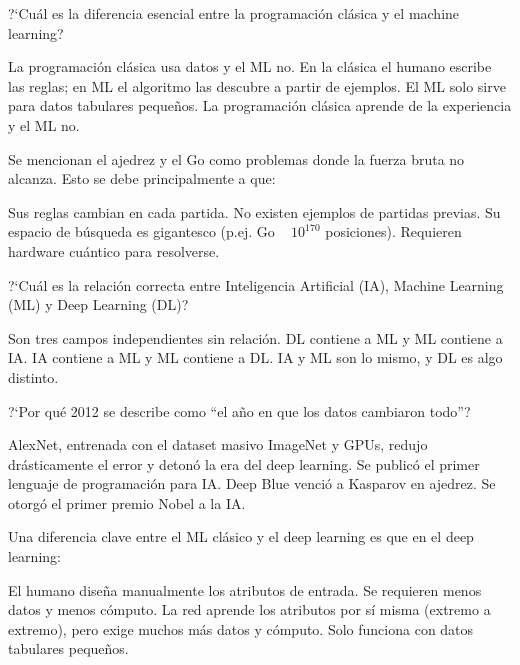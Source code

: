 \documentclass[12pt,addpoints]{exam}
\begin{document}
\begin{questions}
\question[1] ?`Cu\'al es la diferencia esencial entre la programaci\'on cl\'asica
y el machine learning?
\begin{choices}
  \choice La programaci\'on cl\'asica usa datos y el ML no.
  \CorrectChoice En la cl\'asica el humano escribe las reglas; en ML el algoritmo
    las descubre a partir de ejemplos.
  \choice El ML solo sirve para datos tabulares peque\~nos.
  \choice La programaci\'on cl\'asica aprende de la experiencia y el ML no.
\end{choices}

\question[1] Se mencionan el ajedrez y el Go como problemas donde la fuerza bruta
no alcanza. Esto se debe principalmente a que:
\begin{choices}
  \choice Sus reglas cambian en cada partida.
  \choice No existen ejemplos de partidas previas.
  \CorrectChoice Su espacio de b\'usqueda es gigantesco (p.ej. Go ~ $10^{170}$
    posiciones).
  \choice Requieren hardware cu\'antico para resolverse.
\end{choices}

\question[1] ?`Cu\'al es la relaci\'on correcta entre Inteligencia Artificial
(IA), Machine Learning (ML) y Deep Learning (DL)?
\begin{choices}
  \choice Son tres campos independientes sin relaci\'on.
  \choice DL contiene a ML y ML contiene a IA.
  \CorrectChoice IA contiene a ML y ML contiene a DL.
  \choice IA y ML son lo mismo, y DL es algo distinto.
\end{choices}

\question[1] ?`Por qu\'e 2012 se describe como ``el a\~no en que los datos
cambiaron todo''?
\begin{choices}
  \CorrectChoice AlexNet, entrenada con el dataset masivo ImageNet y GPUs, redujo
    dr\'asticamente el error y deton\'o la era del deep learning.
  \choice Se public\'o el primer lenguaje de programaci\'on para IA.
  \choice Deep Blue venci\'o a Kasparov en ajedrez.
  \choice Se otorg\'o el primer premio Nobel a la IA.
\end{choices}

\question[1] Una diferencia clave entre el ML cl\'asico y el deep learning es
que en el deep learning:
\begin{choices}
  \choice El humano dise\~na manualmente los atributos de entrada.
  \choice Se requieren menos datos y menos c\'omputo.
  \CorrectChoice La red aprende los atributos por s\'i misma (extremo a extremo),
    pero exige muchos m\'as datos y c\'omputo.
  \choice Solo funciona con datos tabulares peque\~nos.
\end{choices}


\end{questions}
\end{document}
